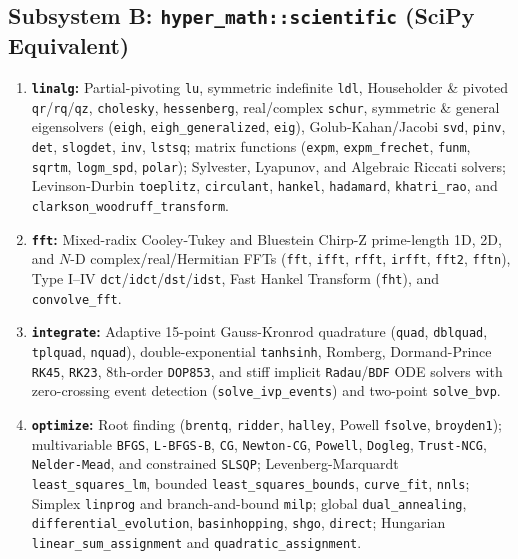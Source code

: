 \documentclass[11pt,a4paper]{article}
\begin{document}
\subsection{Subsystem B: \texttt{hyper\_math::scientific} (SciPy Equivalent)}
\begin{enumerate}[leftmargin=1.5em]
  \item \textbf{\texttt{linalg}:} Partial-pivoting \texttt{lu}, symmetric indefinite \texttt{ldl}, Householder \& pivoted \texttt{qr}/\texttt{rq}/\texttt{qz}, \texttt{cholesky}, \texttt{hessenberg}, real/complex \texttt{schur}, symmetric \& general eigensolvers (\texttt{eigh}, \texttt{eigh\_generalized}, \texttt{eig}), Golub-Kahan/Jacobi \texttt{svd}, \texttt{pinv}, \texttt{det}, \texttt{slogdet}, \texttt{inv}, \texttt{lstsq}; matrix functions (\texttt{expm}, \texttt{expm\_frechet}, \texttt{funm}, \texttt{sqrtm}, \texttt{logm\_spd}, \texttt{polar}); Sylvester, Lyapunov, and Algebraic Riccati solvers; Levinson-Durbin \texttt{toeplitz}, \texttt{circulant}, \texttt{hankel}, \texttt{hadamard}, \texttt{khatri\_rao}, and \texttt{clarkson\_woodruff\_transform}.
  \item \textbf{\texttt{fft}:} Mixed-radix Cooley-Tukey and Bluestein Chirp-Z prime-length 1D, 2D, and $N$-D complex/real/Hermitian FFTs (\texttt{fft}, \texttt{ifft}, \texttt{rfft}, \texttt{irfft}, \texttt{fft2}, \texttt{fftn}), Type I--IV \texttt{dct}/\texttt{idct}/\texttt{dst}/\texttt{idst}, Fast Hankel Transform (\texttt{fht}), and \texttt{convolve\_fft}.
  \item \textbf{\texttt{integrate}:} Adaptive 15-point Gauss-Kronrod quadrature (\texttt{quad}, \texttt{dblquad}, \texttt{tplquad}, \texttt{nquad}), double-exponential \texttt{tanhsinh}, Romberg, Dormand-Prince \texttt{RK45}, \texttt{RK23}, 8th-order \texttt{DOP853}, and stiff implicit \texttt{Radau}/\texttt{BDF} ODE solvers with zero-crossing event detection (\texttt{solve\_ivp\_events}) and two-point \texttt{solve\_bvp}.
  \item \textbf{\texttt{optimize}:} Root finding (\texttt{brentq}, \texttt{ridder}, \texttt{halley}, Powell \texttt{fsolve}, \texttt{broyden1}); multivariable \texttt{BFGS}, \texttt{L-BFGS-B}, \texttt{CG}, \texttt{Newton-CG}, \texttt{Powell}, \texttt{Dogleg}, \texttt{Trust-NCG}, \texttt{Nelder-Mead}, and constrained \texttt{SLSQP}; Levenberg-Marquardt \texttt{least\_squares\_lm}, bounded \texttt{least\_squares\_bounds}, \texttt{curve\_fit}, \texttt{nnls}; Simplex \texttt{linprog} and branch-and-bound \texttt{milp}; global \texttt{dual\_annealing}, \texttt{differential\_evolution}, \texttt{basinhopping}, \texttt{shgo}, \texttt{direct}; Hungarian \texttt{linear\_sum\_assignment} and \texttt{quadratic\_assignment}.

\end{enumerate}
\end{document}
